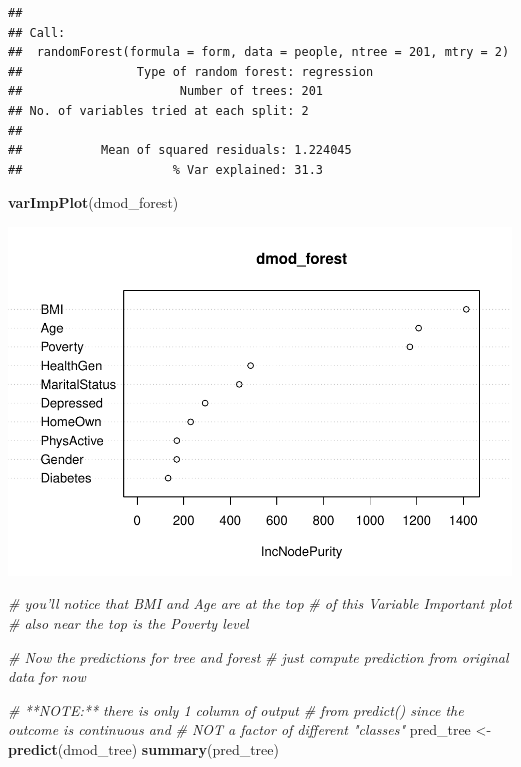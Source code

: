 \documentclass[]{article}
\newenvironment{Shaded}{\begin{snugshade}}{\end{snugshade}}
\newcommand{\KeywordTok}[1]{\textcolor[rgb]{0.13,0.29,0.53}{\textbf{{#1}}}}
\newcommand{\StringTok}[1]{\textcolor[rgb]{0.31,0.60,0.02}{{#1}}}
\newcommand{\CommentTok}[1]{\textcolor[rgb]{0.56,0.35,0.01}{\textit{{#1}}}}
\newcommand{\NormalTok}[1]{{#1}}
\begin{document}
\begin{verbatim}
## 
## Call:
##  randomForest(formula = form, data = people, ntree = 201, mtry = 2) 
##                Type of random forest: regression
##                      Number of trees: 201
## No. of variables tried at each split: 2
## 
##           Mean of squared residuals: 1.224045
##                     % Var explained: 31.3
\end{verbatim}

\begin{Shaded}
\begin{Highlighting}[]
\KeywordTok{varImpPlot}\NormalTok{(dmod_forest)}
\end{Highlighting}
\end{Shaded}

\includegraphics{Hmwk7AnswerKey_files/figure-latex/unnamed-chunk-28-2.pdf}

\begin{Shaded}
\begin{Highlighting}[]
\CommentTok{# you'll notice that BMI and Age are at the top}
\CommentTok{# of this Variable Important plot}
\CommentTok{# also near the top is the Poverty level}

\CommentTok{# Now the predictions for tree and forest}
\CommentTok{# just compute prediction from original data for now}

\CommentTok{# **NOTE:** there is only 1 column of output}
\CommentTok{# from predict() since the outcome is continuous and}
\CommentTok{# NOT a factor of different "classes"}
\NormalTok{pred_tree <-}\StringTok{ }\KeywordTok{predict}\NormalTok{(dmod_tree)}
\KeywordTok{summary}\NormalTok{(pred_tree)}
\end{Highlighting}
\end{Shaded}
\end{document}

